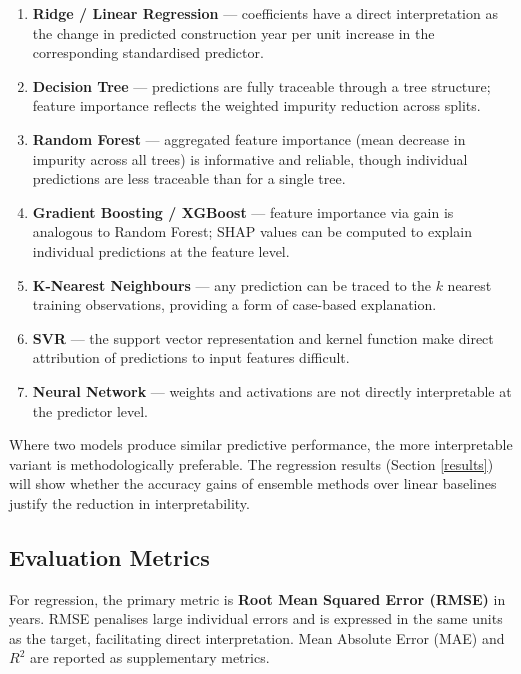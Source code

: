 \documentclass[11pt,a4paper]{article}
\providecommand{\tightlist}{\setlength{\itemsep}{0pt}\setlength{\parskip}{0pt}}
\begin{document}
\begin{enumerate}
\def\labelenumi{\arabic{enumi}.}
\tightlist
\item
  \textbf{Ridge / Linear Regression} --- coefficients have a direct
  interpretation as the change in predicted construction year per unit
  increase in the corresponding standardised predictor.
\item
  \textbf{Decision Tree} --- predictions are fully traceable through a
  tree structure; feature importance reflects the weighted impurity
  reduction across splits.
\item
  \textbf{Random Forest} --- aggregated feature importance (mean
  decrease in impurity across all trees) is informative and reliable,
  though individual predictions are less traceable than for a single
  tree.
\item
  \textbf{Gradient Boosting / XGBoost} --- feature importance via gain
  is analogous to Random Forest; SHAP values can be computed to explain
  individual predictions at the feature level.
\item
  \textbf{K-Nearest Neighbours} --- any prediction can be traced to the
  \(k\) nearest training observations, providing a form of case-based
  explanation.
\item
  \textbf{SVR} --- the support vector representation and kernel function
  make direct attribution of predictions to input features difficult.
\item
  \textbf{Neural Network} --- weights and activations are not directly
  interpretable at the predictor level.
\end{enumerate}

Where two models produce similar predictive performance, the more
interpretable variant is methodologically preferable. The regression
results (Section \ref{results}) will show whether the accuracy gains of
ensemble methods over linear baselines justify the reduction in
interpretability.

\subsection{Evaluation Metrics}\label{evaluation-metrics}

For regression, the primary metric is \textbf{Root Mean Squared Error
(RMSE)} in years. RMSE penalises large individual errors and is
expressed in the same units as the target, facilitating direct
interpretation. Mean Absolute Error (MAE) and \(R^2\) are reported as
supplementary metrics.
\end{document}
